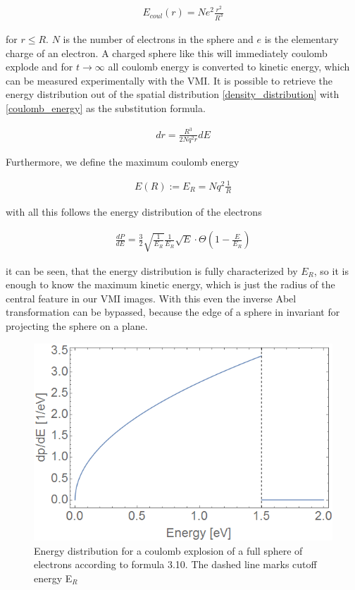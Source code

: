{\begin{align}
E_{coul}(r)=Ne^2 \frac{r^2}{R^3}
\label{coulomb_energy}
\end{align}

for $r\leq R$. $N$ is the number of electrons in the sphere and $e$ is the elementary charge of an electron. A charged sphere like this will immediately coulomb explode and for $t \longrightarrow \infty$ all coulomb energy is converted to kinetic energy, which can be measured experimentally with the VMI. It is possible to retrieve the energy distribution out of the spatial distribution \ref{density_distribution} with \ref{coulomb_energy} as the substitution formula.

\begin{align}
dr=\frac{R^3}{2Nq^2r}dE
\label{substitution}
\end{align}

Furthermore, we define the maximum coulomb energy

\begin{align}
E(R):=E_R=Nq^2 \frac{1}{R}
\label{max_coul_energy}
\end{align}

with all this follows the energy distribution of the electrons

\begin{align}
\frac{dP}{dE}=\frac{3}{2} \sqrt{\frac{1}{E_R}} \frac{1}{E_R}\sqrt{E} \cdot \Theta (1-\frac{E}{E_R})
\end{align}

it can be seen, that the energy distribution is fully characterized by $E_R$, so it is enough to know the maximum kinetic energy, which is just the radius of the central feature in our VMI images. With this even the inverse Abel transformation can be bypassed, because the edge of a sphere in invariant for projecting the sphere on a plane.
\begin{figure}[hbtp]

\centering
\includegraphics[scale=0.4]{../Images/linemodelfit.png}
\caption[Islam Model fit]{Energy distribution for a coulomb explosion of a full sphere of electrons according to formula 3.10. The dashed line marks cutoff energy E$_{R} $}
\end{figure}


}
